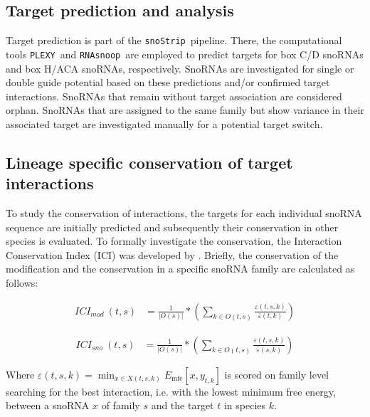 \documentclass[preprint,3p,times,twocolumn]{elsarticle}
\newcommand{\cd}{box C/D snoRNA}
\newcommand{\haca}{box H/ACA snoRNA}
\newcommand{\snostrip}{\texttt{snoStrip}}
\newcommand{\plexy}{\texttt{PLEXY}}
\newcommand{\snoop}{\texttt{RNAsnoop}}
\begin{document}
\subsection{Target prediction and analysis}

Target prediction is part of the \snostrip\ pipeline. There, the computational tools \plexy\ and \snoop\ are employed to predict targets for \cd s and \haca s, respectively. 
SnoRNAs are investigated for single or double guide potential based on these predictions and/or confirmed target interactions. SnoRNAs that remain without target association are considered orphan. SnoRNAs that are assigned to the same family but show variance in their associated target are investigated manually for a potential target switch.


\subsection{Lineage specific conservation of target interactions}
To study the conservation of interactions, the targets for each individual snoRNA sequence are initially predicted and subsequently their conservation in other species is evaluated. To formally investigate the conservation, the Interaction Conservation Index (ICI) was developed by \cite{Kehr:2014}. Briefly, the conservation of the modification and the conservation in a specific snoRNA family are calculated as follows:

\begin{equation}
  \begin{split}
    ICI_{mod}\:(t,s) & = \frac{1}{|O(s)|} * \left( \sum_{k\in O(t,s)} \frac{\varepsilon(t,s,k)}{\bar\varepsilon(t,k)} \right) 
  \end{split}
\end{equation}

\begin{equation}
  \begin{split}
    ICI_{sno}\:(t,s) & = \frac{1}{|O(s)|} * \left( \sum_{k\in O(t,s)} \frac{\varepsilon(t,s,k)}{\hat\varepsilon(s,k)} \right)
  \end{split}
\end{equation}

Where
$ \varepsilon(t,s,k) = \min_{x\in X(t,s,k)} E_{\textrm{mfe}}[x,y_{t,k}] $
is scored on family level searching for the best interaction, i.e. with the lowest minimum free energy, between a snoRNA $x$ of family $s$ and the target $t$ in species $k$.
\end{document}
